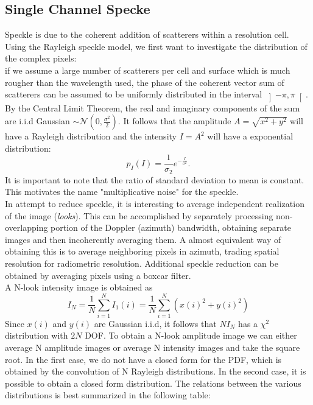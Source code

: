 \documentclass[11pt]{article}
\begin{document}
\subsection{Single Channel Specke}
Speckle is due to the coherent addition of scatterers within a resolution cell. Using the Rayleigh speckle model, we first want to investigate the distribution of the complex pixels:\\
if we assume a large number of scatterers per cell and surface which is much rougher than the wavelength used, the phase of the coherent vector sum of scatterers can be assumed to be uniformly distributed in the interval $\left]-\pi,\pi\right[$. By the Central Limit Theorem, the real and imaginary components of the sum are i.i.d Gaussian $\sim\mathcal{N}\left(0, 
\frac{\sigma^{2}}{2}\right)$.
It follows that the amplitude $A = \sqrt{x^{2}+y^{2}}$ will have a Rayleigh distribution and the intensity $I = A^{2}$ will have a exponential distribution:
\begin{equation}
	p_{I}\left(I\right) = \frac{1}{\sigma_{2}}e^{-\frac{I}{\sigma^{2}}}.
\end{equation}
It is important to note that the ratio of standard deviation to mean is constant. This motivates the name "multiplicative noise" for the speckle.\\
In attempt to reduce speckle, it is interesting to average independent realization of the image (\emph{looks}). This can be accomplished by separately processing non-overlapping portion of the Doppler (azimuth) bandwidth, obtaining separate images and then incoherently averaging them. A almost equivalent way of obtaining this is to average neighboring pixels in azimuth, trading spatial resolution for radiometric resolution. Additional speckle reduction can be obtained by averaging pixels using a boxcar filter.\\
A N-look intensity image is obtained as
\begin{equation}
	I_{N} = \frac{1}{N} \sum_{i=1}^{N} I_{1}\left(i\right) =  \frac{1}{N} \sum_{i=1}^{N} \left(x\left(i\right)^{2}+y\left(i\right)^{2}\right)
\end{equation}
Since $x\left(i\right)$ and $y\left(i\right)$ are Gaussian i.i.d, it follows that $NI_{N}$ has a $\chi^{2}$ distribution with $2N$ DOF.
To obtain a N-look amplitude image we can either average N amplitude images or average N intensity images and take the square root. In the first case, we do not have a closed form for the PDF, which is obtained by the convolution of N Rayleigh distributions. In the second case, it is possible to obtain a closed form distribution. The relations between the various distributions is best summarized in the following table:
\end{document}
